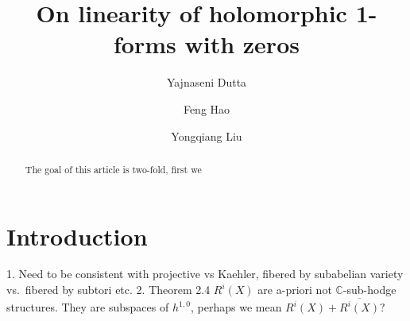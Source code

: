 \documentclass[a4paper,12pt,reqno]{amsart}
\theoremstyle{plain}
\theoremstyle{definition}
\theoremstyle{remark}
\newcommand{\bbC}{\mathbb{C}}
\begin{document}
  
\title[On linearity of holomorphic 1-forms with zeros]{On linearity of holomorphic 1-forms with zeros} 

\author{Yajnaseni Dutta}


\author{Feng Hao}


\author{Yongqiang Liu}

%




\begin{abstract} 
The goal of this article is two-fold, first we 
\end{abstract}

\maketitle

\section{Introduction}\label{intro}
\textcolor{blue!70!white}{1. Need to be consistent with projective vs Kaehler, fibered by subabelian variety vs.\ fibered by subtori etc.
2. Theorem 2.4 $R^i(X)$ are a-priori not $\bbC$-sub-hodge structures. They are subspaces of $h^{1,0}$, perhaps we mean $R^i(X)+\overline{R^i(X)}?$}
\end{document}
